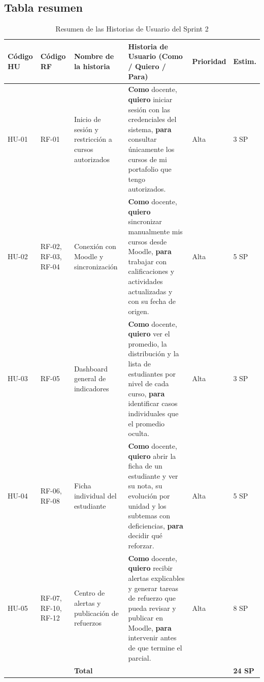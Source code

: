 \documentclass[11pt,a4paper]{article}
\newcommand{\hd}[1]{\textbf{#1}}
\begin{document}
\subsection{Tabla resumen}
\begin{table}[H]
\centering\small
\caption{Resumen de las Historias de Usuario del Sprint 2}
\begin{tabularx}{\textwidth}{|R{1.2cm}|R{1.7cm}|R{2.8cm}|Y|R{1.3cm}|R{1.2cm}|}
\hline
\hd{Código HU} & \hd{Código RF} & \hd{Nombre de la historia} & \hd{Historia de Usuario (Como / Quiero / Para)} & \hd{Prioridad} & \hd{Estim.}\\ \hline
HU-01 & RF-01 & Inicio de sesión y restricción a cursos autorizados & \textbf{Como} docente, \textbf{quiero} iniciar sesión con las credenciales del sistema, \textbf{para} consultar únicamente los cursos de mi portafolio que tengo autorizados. & Alta & 3 SP\\ \hline
HU-02 & RF-02, RF-03, RF-04 & Conexión con Moodle y sincronización & \textbf{Como} docente, \textbf{quiero} sincronizar manualmente mis cursos desde Moodle, \textbf{para} trabajar con calificaciones y actividades actualizadas y con su fecha de origen. & Alta & 5 SP\\ \hline
HU-03 & RF-05 & Dashboard general de indicadores & \textbf{Como} docente, \textbf{quiero} ver el promedio, la distribución y la lista de estudiantes por nivel de cada curso, \textbf{para} identificar casos individuales que el promedio oculta. & Alta & 3 SP\\ \hline
HU-04 & RF-06, RF-08 & Ficha individual del estudiante & \textbf{Como} docente, \textbf{quiero} abrir la ficha de un estudiante y ver su nota, su evolución por unidad y los subtemas con deficiencias, \textbf{para} decidir qué reforzar. & Alta & 5 SP\\ \hline
HU-05 & RF-07, RF-10, RF-12 & Centro de alertas y publicación de refuerzos & \textbf{Como} docente, \textbf{quiero} recibir alertas explicables y generar tareas de refuerzo que pueda revisar y publicar en Moodle, \textbf{para} intervenir antes de que termine el parcial. & Alta & 8 SP\\ \hline
 & & \textbf{Total} & & & \textbf{24 SP}\\ \hline
\end{tabularx}
\end{table}
\end{document}
